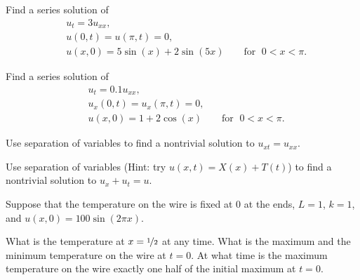 \setcounter{exercise}{100}


\begin{exercise}
Find a series solution of
\begin{align*}
& u_t =  3 u_{xx} , \\
& u(0,t) = u(\pi,t) = 0 , \\
& u(x,0) = 5\sin (x) + 2\sin (5x) \qquad \text{for } \; 0 < x < \pi .
\end{align*}
\end{exercise}


\begin{exercise}
Find a series solution of
\begin{align*}
& u_t =  0.1 u_{xx} , \\
& u_x(0,t) = u_x(\pi,t) = 0 , \\
& u(x,0) = 1 + 2\cos (x) \qquad \text{for } \; 0 < x < \pi .
\end{align*}
\end{exercise}

\begin{exercise}
Use separation of variables to find a nontrivial solution to
$u_{xt} = u_{xx}$.
\end{exercise}

\begin{exercise}
Use separation of variables (Hint: try $u(x,t) = X(x)+T(t)$)
to find a nontrivial solution to
$u_{x} + u_{t} = u$.
\end{exercise}

\begin{exercise}
Suppose that the temperature on the wire is fixed at $0$
at the ends, $L=1$, $k=1$, and $u(x,0) = 100\sin(2 \pi x)$.
\begin{tasks}
\task
What is the temperature at $x = \nicefrac{1}{2}$ at any time.
\task
What is the maximum and the minimum temperature on the wire
at $t=0$.
\task
At what time is the maximum temperature on the wire exactly
one half of the initial maximum at $t=0$.
\end{tasks}
\end{exercise}

